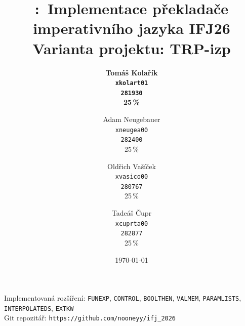 \documentclass{article}
\title{
\vspace{2in}
\textmd{\textbf{\hmwkClass:\ Implementace překladače imperativního jazyka IFJ26}}\\
Varianta projektu: TRP-izp \\
\vspace{2in}
}
\author{%
  \textbf{Tomáš Kolařík} \\
  \textbf{\texttt{xkolart01}} \\
  \textbf{\texttt{281930}} \\
  \textbf{25\,\%}%
  \and
  Adam Neugebauer \\
  \texttt{xneugea00} \\
  \texttt{282400} \\
  25\,\%%
  \and
  Oldřich Vašíček \\
  \texttt{xvasico00} \\
  \texttt{280767} \\
  25\,\%%
  \and
  Tadeáš Čupr \\
  \texttt{xcuprta00} \\
  \texttt{282877} \\
  25\,\%%
}
\date{\today}
\begin{document}
\maketitle

\begin{center}
Implementovaná rozšíření: \texttt{FUNEXP}, \texttt{CONTROL}, \texttt{BOOLTHEN},
\texttt{VALMEM}, \texttt{PARAMLISTS}, \texttt{INTERPOLATEDS}, \texttt{EXTKW}\\[1ex]
Git repozitář: \texttt{https://github.com/nooneyy/ifj\_2026}
\end{center}



\newpage
\tableofcontents
\newpage

\end{document}
